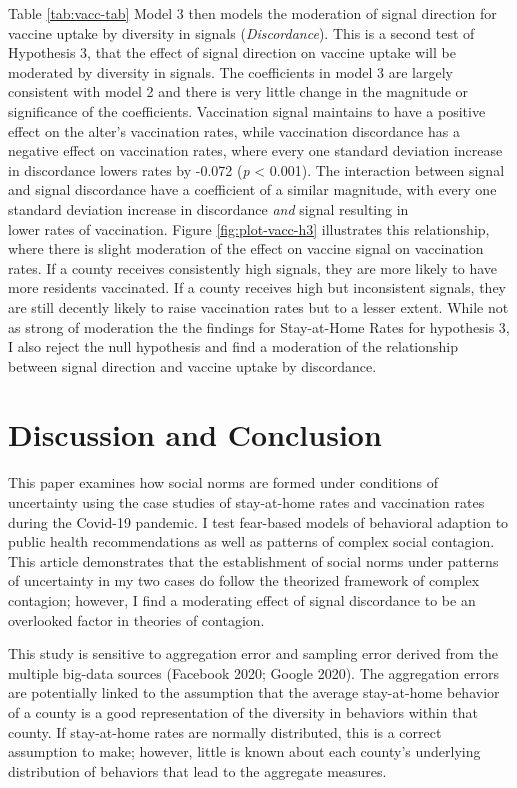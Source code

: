 Table \ref{tab:vacc-tab} Model 3 then models the moderation of signal direction
for vaccine uptake by diversity in signals (\emph{Discordance}). This is a second
test of Hypothesis 3, that the effect of signal direction on vaccine uptake will
be moderated by diversity in signals. The coefficients in model 3 are largely
consistent with model 2 and there is very little change in the magnitude
or significance of the coefficients. Vaccination signal maintains to have a positive
effect on the alter's vaccination rates, while vaccination discordance has a negative effect on vaccination rates, where every one standard deviation increase in discordance lowers rates by
-0.072
(\emph{p} \textless{} 0.001). The interaction between signal and signal discordance have a
coefficient of a similar magnitude, with every one standard deviation increase
in discordance \emph{and} signal resulting in\\
lower rates of vaccination. Figure \ref{fig:plot-vacc-h3} illustrates this
relationship, where there is slight moderation of the effect on vaccine signal
on vaccination rates. If a county receives consistently high signals, they are
more likely to have more residents vaccinated. If a county receives high but
inconsistent signals, they are still decently likely to raise vaccination rates
but to a lesser extent. While not as strong of moderation the the findings for
Stay-at-Home Rates for hypothesis 3, I also reject the null hypothesis and find
a moderation of the relationship between signal direction and vaccine uptake by
discordance.

\hypertarget{discussion-and-conclusion}{%
\section{Discussion and Conclusion}\label{discussion-and-conclusion}}

This paper examines how social norms are formed under conditions of uncertainty
using the case studies of stay-at-home rates and vaccination rates during the
Covid-19 pandemic. I test fear-based models of behavioral adaption to public
health recommendations as well as patterns of complex social contagion. This
article demonstrates that the establishment of social norms under patterns of
uncertainty in my two cases do follow the theorized framework of complex
contagion; however, I find a moderating effect of signal discordance to be an
overlooked factor in theories of contagion.

This study is sensitive to aggregation error and sampling error derived from the
multiple big-data sources (Facebook 2020; Google 2020). The aggregation errors are
potentially linked to the assumption that the average stay-at-home behavior of a
county is a good representation of the diversity in behaviors within that
county. If stay-at-home rates are normally distributed, this is a correct
assumption to make; however, little is known about each county's underlying
distribution of behaviors that lead to the aggregate measures.

